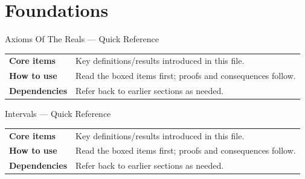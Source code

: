 \section{Foundations}

\begin{toolkitbox}{Axioms Of The Reals --- Quick Reference}
\begin{tabular}{@{}p{}p{}@{}}
\textbf{Core items} & Key definitions/results introduced in this file.\\
\textbf{How to use} & Read the boxed items first; proofs and consequences follow.\\
\textbf{Dependencies} & Refer back to earlier sections as needed.\\
\end{tabular}
\end{toolkitbox}

\begin{toolkitbox}{Intervals --- Quick Reference}
\begin{tabular}{@{}p{}p{}@{}}
\textbf{Core items} & Key definitions/results introduced in this file.\\
\textbf{How to use} & Read the boxed items first; proofs and consequences follow.\\
\textbf{Dependencies} & Refer back to earlier sections as needed.\\
\end{tabular}
\end{toolkitbox}




